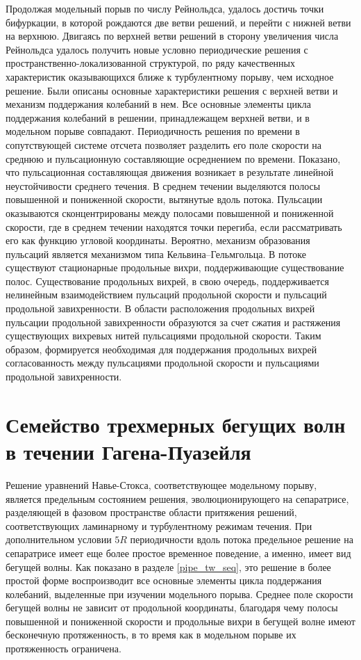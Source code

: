 Продолжая модельный порыв по числу Рейнольдса, удалось достичь точки бифуркации, в которой рождаются две ветви решений, и перейти с нижней ветви на верхнюю. Двигаясь по верхней ветви решений в сторону увеличения числа Рейнольдса удалось получить новые условно периодические решения с пространственно-локализованной структурой, по ряду качественных характеристик оказывающихся ближе к турбулентному порыву, чем исходное решение. Были описаны основные характеристики решения с верхней ветви и механизм поддержания колебаний в нем. Все основные элементы цикла поддержания колебаний в решении, принадлежащем верхней ветви, и в модельном порыве совпадают. Периодичность решения по времени в сопутствующей системе отсчета позволяет разделить его поле скорости на среднюю и пульсационную составляющие осреднением по времени. Показано, что пульсационная составляющая движения возникает в результате линейной неустойчивости среднего течения. В среднем течении выделяются полосы повышенной и пониженной скорости, вытянутые вдоль потока. Пульсации оказываются сконцентрированы между полосами повышенной и пониженной скорости, где в среднем течении находятся точки перегиба, если рассматривать его как функцию угловой координаты. Вероятно, механизм образования пульсаций является механизмом типа Кельвина--Гельмгольца. В потоке существуют стационарные продольные вихри, поддерживающие существование полос. Существование продольных вихрей, в свою очередь, поддерживается нелинейным взаимодействием пульсаций продольной скорости и пульсаций продольной завихренности. В области расположения продольных вихрей пульсации продольной завихренности образуются за счет сжатия и растяжения существующих вихревых нитей пульсациями продольной скорости. Таким образом, формируется необходимая для поддержания продольных вихрей согласованность между пульсациями продольной скорости и пульсациями продольной завихренности. 

\section{Семейство трехмерных бегущих волн в течении Гагена-Пуазейля} \label{pipeTW_seq}

Решение уравнений Навье-Стокса, соответствующее модельному порыву, является предельным состоянием решения, эволюционирующего на сепаратрисе, разделяющей в фазовом пространстве области притяжения решений, соответствующих ламинарному и турбулентному режимам течения. При дополнительном условии $5R$ периодичности вдоль потока предельное решение на сепаратрисе имеет еще более простое временное поведение, а именно, имеет вид бегущей волны. Как показано в разделе \ref{pipe_tw_seq}, это решение в более простой форме воспроизводит все основные элементы цикла поддержания колебаний, выделенные при изучении модельного порыва. Среднее поле скорости бегущей волны не зависит от продольной координаты, благодаря чему полосы повышенной и пониженной скорости и продольные вихри в бегущей волне имеют бесконечную протяженность, в то время как в модельном порыве их протяженность ограничена. 


